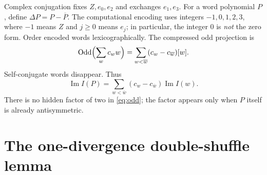 \documentclass[11pt,letterpaper]{article}
\numberwithin{equation}{section}
\theoremstyle{definition}
\DeclareMathOperator{\Imag}{Im}
\DeclareMathOperator{\Odd}{Odd}
\begin{document}
Complex conjugation fixes $Z,e_0,e_2$ and exchanges $e_1,e_3$. For a word
polynomial $P$, define $\Delta P=P-\overline P$. The computational
encoding uses integers $-1,0,1,2,3$, where $-1$ means $Z$ and $j\ge0$
means $e_j$; in particular, the integer $0$ is \emph{not} the zero form.
Order encoded words lexicographically. The compressed odd projection is
\begin{equation}
 \Odd\Bigl(\sum_w c_ww\Bigr)
 =\sum_{w<\overline w}(c_w-c_{\overline w})[w].
 \label{eq:odd}
\end{equation}
Self-conjugate words disappear. Thus
\begin{equation}
 \Imag I(P)=\sum_{w<\overline w}
              (c_w-c_{\overline w})\Imag I(w).
 \label{eq:oddmeaning}
\end{equation}
There is no hidden factor of two in \eqref{eq:odd}; the factor appears
only when $P$ itself is already antisymmetric.

\section{The one-divergence double-shuffle lemma}
\label{sec:regularization}
\end{document}
